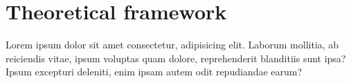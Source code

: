 
\section{Theoretical framework}

Lorem ipsum dolor sit amet consectetur, adipisicing elit. Laborum mollitia, ab
reiciendis vitae, ipsum voluptas quam dolore, reprehenderit blanditiis sunt
ipsa? Ipsum excepturi deleniti, enim ipsam autem odit repudiandae earum?